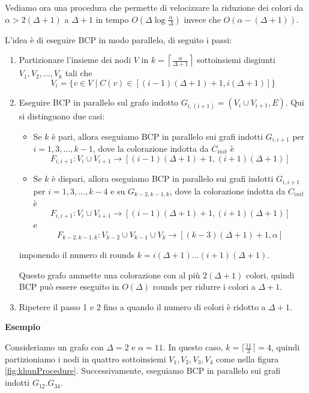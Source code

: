 Vediamo ora una procedura che permette di velocizzare la riduzione dei colori da $\alpha > 2(\Delta + 1)$ a $\Delta + 1$ in tempo $O(\Delta \log\frac{\alpha}{\Delta})$ invece che $O(\alpha - (\Delta + 1))$.

L'idea è di eseguire BCP in modo parallelo, di seguito i passi:

\begin{enumerate}
    \item Partizionare l'insieme dei nodi $V$ in $k = \left\lceil \frac{\alpha}{\Delta + 1} \right\rceil$ sottoinsiemi disgiunti $V_1, V_2, \dots, V_k$ tali che
    \[
        V_i = \{v \in V \mid C(v) \in [(i-1)(\Delta + 1) + 1, i(\Delta + 1)]\}
    \]
    \item Eseguire BCP in parallelo sul grafo indotto $G_{i, (i + 1)} = (V_i \cup V_{i+1}, E)$.
    Qui si distinguono due casi:
    \begin{itemize}
        \item   Se $k$ è pari, allora eseguiamo BCP in parallelo sui grafi indotti $G_{i, i+1}$ per $i = 1, 3, \dots, k-1$, dove la colorazione indotta da $C_{init}$ è 
        \[
            F_{i, i+1}: V_i \cup V_{i+1} \to [(i-1)(\Delta + 1) + 1, (i + 1)(\Delta + 1)]
        \]
        \item   Se $k$ è dispari, allora eseguiamo BCP in parallelo sui grafi indotti $G_{i, i+1}$ per $i = 1, 3, \dots, k-4$ e su $G_{k-2, k-1, k}$, dove la colorazione indotta da $C_{init}$ è
        \[
            F_{i, i+1}: V_i \cup V_{i+1} \to [(i-1)(\Delta + 1) + 1, (i + 1)(\Delta + 1)]
        \]
         e
        \[
            F_{k-2, k-1, k}: V_{k-2} \cup V_{k-1} \cup V_k \to [(k-3)(\Delta + 1) + 1, \alpha]
        \]
    \end{itemize}
    
    imponendo il numero di rounds $k = i(\Delta + 1) \dots (i+1)(\Delta + 1)$. 
    
    Questo grafo ammette una colorazione con al più $2(\Delta + 1)$ colori, quindi BCP può essere eseguito in $O(\Delta)$ rounds per ridurre i colori a $\Delta + 1$.
    \item Ripetere il passo 1 e 2 fino a quando il numero di colori è ridotto a $\Delta + 1$.
\end{enumerate}

\textbf{Esempio}

Consideriamo un grafo con $\Delta = 2$ e $\alpha = 11$. In questo caso, $k = \lceil \frac{11}{3} \rceil = 4$, quindi partizioniamo i nodi in quattro sottoinsiemi $V_1, V_2, V_3, V_4$ come nella figura \autoref{fig:khunProcedure}. Successivamente, eseguiamo BCP in parallelo sui grafi indotti $G_{12}. G_{34}$.

